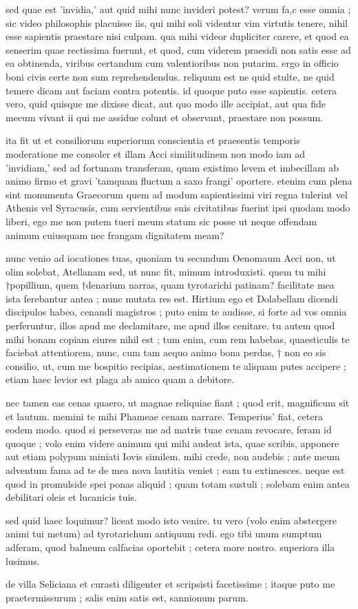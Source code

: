  sed quae est 'invidia,' aut quid mihi nunc invideri potest? verum fa,c esse omnia ; sic video philosophis placuisse iis, qui mihi soli videntur vim virtutis tenere, nihil esse sapientis praestare nisi culpam. qua mihi videor dupliciter carere, et quod ea senserim quae rectissima fuerunt, et quod, cum viderem praesidi non satis esse ad ea obtinenda, viribus certandum cum valentioribus non putarim. ergo in officio boni civis certe non sum reprehendendus. reliquum est ne quid stulte, ne quid temere dicam aut faciam contra potentis. id quoque puto esse sapientis. cetera vero, quid quisque me dixisse dicat, aut quo modo ille accipiat, aut qua fide mecum vivant ii qui me assidue colunt et observant, praestare non possum.

 ita fit ut et consiliorum superiorum conscientia et praesentis temporis moderatione me consoler et illam Acci similitudinem non modo iam ad 'invidiam,' sed ad fortunam transferam, quam existimo levem et imbecillam ab animo firmo et gravi 'tamquam fluctum a saxo frangi' oportere. etenim cum plena sint monumenta Graecorum quem ad modum sapientissimi viri regna tulerint vel Athenis vel Syracusis, cum servientibus suis civitatibus fuerint ipsi quodam modo liberi, ego me non putem tueri meum statum sic posse ut neque offendam animum cuiusquam nec frangam dignitatem meam?

 nunc venio ad iocationes tuas, quoniam tu secundum Oenomaum Acci non, ut olim solebat, Atellanam sed, ut nunc fit, mimum introduxisti. quem tu mihi †popillium, quem †denarium narras, quam tyrotarichi patinam? facilitate mea ista ferebantur antea ; nunc mutata res est. Hirtium ego et Dolabellam dicendi discipulos habeo, cenandi magistros ; puto enim te audisse, si forte ad vos omnia perferuntur, illos apud me declamitare, me apud illos cenitare. tu autem quod mihi bonam copiam eiures nihil est ; tum enim, cum rem habebas, quaesticulis te faciebat attentiorem, nunc, cum tam aequo animo bona perdas, † non eo sis consilio, ut, cum me bospitio recipias, aestimationem te aliquam putes accipere ; etiam haec levior est plaga ab amico quam a debitore.

 nec tamen eas cenas quaero, ut magnae reliquiae fiant ; quod erit, magnificum sit et lautum. memini te mihi Phameae cenam narrare. Temperius' fiat, cetera eodem modo. quod si perseveras me ad matris tuae cenam revocare, feram id quoque ; volo enim videre animum qui mihi audeat ista, quae scribis, apponere aut etiam polypum miniati Iovis similem. mihi crede, non audebis ; ante meum adventum fama ad te de mea nova lautitia veniet ; eam tu extimesces. neque est quod in promulside spei ponas aliquid ; quam totam sustuli ; solebam enim antea debilitari oleis et lucanicis tuis.

 sed quid haec loquimur? liceat modo isto venire. tu vero (volo enim abstergere animi tui metum) ad tyrotarichum antiquum redi. ego tibi unum sumptum adferam, quod balneum calfacias oportebit ; cetera more nostro. superiora illa lusimus.

 de villa Seliciana et curasti diligenter et scripsisti facetissime ; itaque puto me praetermissurum ; salis enim satis est, sannionum parum.
